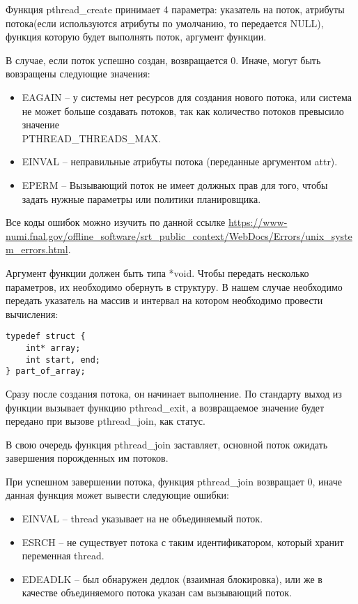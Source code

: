 Функция pthread\_create принимает 4 параметра: указатель на поток, атрибуты потока(если используются атрибуты по умолчанию, то передается NULL), функция которую будет выполнять поток, аргумент функции.

В случае, если поток успешно создан, возвращается 0. Иначе, могут быть вовзращены следующие значения:

\begin{itemize}
    \item EAGAIN – у системы нет ресурсов для создания нового потока, или система не может больше создавать потоков, так как количество потоков превысило значение \\ PTHREAD\_THREADS\_MAX.
    \item EINVAL – неправильные атрибуты потока (переданные аргументом attr).
    \item EPERM – Вызывающий поток не имеет должных прав для того, чтобы задать нужные параметры или политики планировщика.
\end{itemize}

Все коды ошибок можно изучить по данной ссылке \url{https://www-numi.fnal.gov/offline_software/srt_public_context/WebDocs/Errors/unix_system_errors.html}.

Аргумент функции должен быть типа *void. Чтобы передать несколько параметров, их необходимо обернуть в структуру. В нашем случае необходимо передать указатель на массив и интервал на котором необходимо провести вычисления:

\begin{verbatim}
typedef struct {
    int* array;
    int start, end;
} part_of_array;
\end{verbatim}

Сразу после создания потока, он начинает выполнение. По стандарту выход из функции вызывает функцию pthread\_exit, а возвращаемое значение будет передано при вызове pthread\_join, как статус.

В свою очередь функция pthread\_join заставляет, основной поток ожидать завершения порожденных им потоков.

При успешном завершении потока, функция pthread\_join возвращает 0, иначе данная функция может вывести следующие ошибки:

\begin{itemize}
    \item EINVAL – thread указывает на не объединяемый поток.
    \item ESRCH – не существует потока с таким идентификатором, который хранит переменная thread.
    \item EDEADLK – был обнаружен дедлок (взаимная блокировка), или же в качестве объединяемого потока указан сам вызывающий поток.
\end{itemize}

